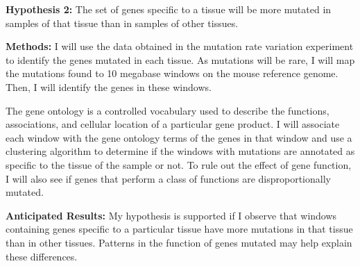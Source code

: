 \documentclass[12pt]{article}
\begin{document}
\textbf{Hypothesis 2:}
The set of genes specific to a tissue will be more mutated in samples of that tissue than in samples of other tissues.

\textbf{Methods:}
I will use the data obtained in the mutation rate variation experiment to identify the genes mutated in each tissue. As mutations will be rare, I will map the mutations found to 10 megabase windows on the mouse reference genome. Then, I will identify the genes in these windows.

The gene ontology is a controlled vocabulary used to describe the functions, associations, and cellular location of a particular gene product. I will associate each window with the gene ontology terms of the genes in that window and use a clustering algorithm to determine if the windows with mutations are annotated as specific to the tissue of the sample or not.%
To rule out the effect of gene function, I will also see if genes that perform a class of functions are disproportionally mutated.


\textbf{Anticipated Results:}
My hypothesis is supported if I observe that windows containing genes specific to a particular tissue have more mutations in that tissue than in other tissues. Patterns in the function of genes mutated may help explain these differences.
\end{document}

